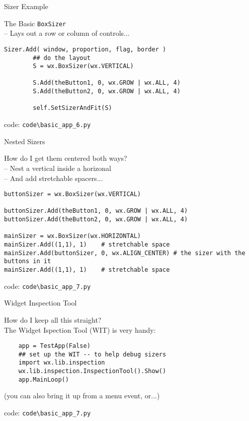 \documentclass{beamer}
\begin{document}
\begin{frame}[fragile]{Sizer Example}

{\Large The Basic \verb`BoxSizer`}\\
{\large  -- Lays out a row or column of controls...}

\vfill
\begin{verbatim}
Sizer.Add( window, proportion, flag, border )
        ## do the layout
        S = wx.BoxSizer(wx.VERTICAL)
        
        S.Add(theButton1, 0, wx.GROW | wx.ALL, 4)
        S.Add(theButton2, 0, wx.GROW | wx.ALL, 4)
        
        self.SetSizerAndFit(S)
\end{verbatim}
\vfill
code: \verb`code\basic_app_6.py`
\end{frame}

\begin{frame}[fragile]{Nested Sizers}

{\Large How do I get them centered both ways?}\\
{\large  -- Nest a vertical inside a horizonal}\\
{\large  -- And add stretchable spacers...}

\vfill
\begin{verbatim}
buttonSizer = wx.BoxSizer(wx.VERTICAL)
        
buttonSizer.Add(theButton1, 0, wx.GROW | wx.ALL, 4)
buttonSizer.Add(theButton2, 0, wx.GROW | wx.ALL, 4)

mainSizer = wx.BoxSizer(wx.HORIZONTAL)
mainSizer.Add((1,1), 1)    # stretchable space
mainSizer.Add(buttonSizer, 0, wx.ALIGN_CENTER) # the sizer with the buttons in it
mainSizer.Add((1,1), 1)    # stretchable space
\end{verbatim}
\vfill
code: \verb`code\basic_app_7.py`
\end{frame}

\begin{frame}[fragile]{Widget Inspection Tool}

{\Large How do I keep all this straight?}\\

\vfill
{\large  The Widget Ispection Tool (WIT) is very handy:}

\vfill
\begin{verbatim}
    app = TestApp(False)
    ## set up the WIT -- to help debug sizers
    import wx.lib.inspection
    wx.lib.inspection.InspectionTool().Show()
    app.MainLoop()
\end{verbatim}

(you can also bring it up from a menu event, or...)

\vfill
code: \verb`code\basic_app_7.py`

\end{frame}
\end{document}
